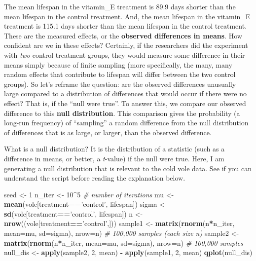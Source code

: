 \documentclass[]{book}
\newenvironment{Shaded}{\begin{snugshade}}{\end{snugshade}}
\newcommand{\KeywordTok}[1]{\textcolor[rgb]{0.13,0.29,0.53}{\textbf{#1}}}
\newcommand{\DataTypeTok}[1]{\textcolor[rgb]{0.13,0.29,0.53}{#1}}
\newcommand{\DecValTok}[1]{\textcolor[rgb]{0.00,0.00,0.81}{#1}}
\newcommand{\StringTok}[1]{\textcolor[rgb]{0.31,0.60,0.02}{#1}}
\newcommand{\CommentTok}[1]{\textcolor[rgb]{0.56,0.35,0.01}{\textit{#1}}}
\newcommand{\OperatorTok}[1]{\textcolor[rgb]{0.81,0.36,0.00}{\textbf{#1}}}
\newcommand{\NormalTok}[1]{#1}
\begin{document}
The mean lifespan in the vitamin\_E treatment is 89.9 days shorter than
the mean lifespan in the control treatment. And, the mean lifespan in
the vitamin\_E treatment is 115.1 days shorter than the mean lifespan in
the control treatment. These are the measured effects, or the
\textbf{observed differences in means}. How confident are we in these
effects? Certainly, if the researchers did the experiment with
\emph{two} control treatment groups, they would measure some difference
in their means simply because of finite sampling (more specifically, the
many, many random effects that contribute to lifespan will differ
between the two control groups). So let's reframe the question: are the
observed differences unusually large compared to a distribution of
differences that would occur if there were no effect? That is, if the
``null were true''. To answer this, we compare our observed difference
to this \textbf{null distribution}. This comparison gives the
probability (a long-run frequency) of ``sampling'' a random difference
from the null distribution of differences that is as large, or larger,
than the observed difference.

What is a null distribution? It is the distribution of a statistic (such
as a difference in means, or better, a \emph{t}-value) if the null were
true. Here, I am generating a null distribution that is relevant to the
cold vole data. See if you can understand the script before reading the
explanation below.

\begin{Shaded}
\begin{Highlighting}[]
\NormalTok{seed <-}\StringTok{ }\DecValTok{1}
\NormalTok{n_iter <-}\StringTok{ }\DecValTok{10}\OperatorTok{^}\DecValTok{5} \CommentTok{# number of iterations}
\NormalTok{mu <-}\StringTok{ }\KeywordTok{mean}\NormalTok{(vole[treatment}\OperatorTok{==}\StringTok{'control'}\NormalTok{, lifespan]) }
\NormalTok{sigma <-}\StringTok{ }\KeywordTok{sd}\NormalTok{(vole[treatment}\OperatorTok{==}\StringTok{'control'}\NormalTok{, lifespan])}
\NormalTok{n <-}\StringTok{ }\KeywordTok{nrow}\NormalTok{((vole[treatment}\OperatorTok{==}\StringTok{'control'}\NormalTok{,]))}
\NormalTok{sample1 <-}\StringTok{ }\KeywordTok{matrix}\NormalTok{(}\KeywordTok{rnorm}\NormalTok{(n}\OperatorTok{*}\NormalTok{n_iter, }\DataTypeTok{mean=}\NormalTok{mu, }\DataTypeTok{sd=}\NormalTok{sigma), }\DataTypeTok{nrow=}\NormalTok{n) }\CommentTok{# 100,000 samples (each size n)}
\NormalTok{sample2 <-}\StringTok{ }\KeywordTok{matrix}\NormalTok{(}\KeywordTok{rnorm}\NormalTok{(n}\OperatorTok{*}\NormalTok{n_iter, }\DataTypeTok{mean=}\NormalTok{mu, }\DataTypeTok{sd=}\NormalTok{sigma), }\DataTypeTok{nrow=}\NormalTok{n) }\CommentTok{# 100,000 samples}
\NormalTok{null_dis <-}\StringTok{ }\KeywordTok{apply}\NormalTok{(sample2, }\DecValTok{2}\NormalTok{, mean) }\OperatorTok{-}\StringTok{ }\KeywordTok{apply}\NormalTok{(sample1, }\DecValTok{2}\NormalTok{, mean)}
\KeywordTok{qplot}\NormalTok{(null_dis)}
\end{Highlighting}
\end{Shaded}
\end{document}
